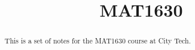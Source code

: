 \documentclass{ximera}
\title{MAT1630}
\begin{document}
  
\begin{abstract} %
This is a set of notes for the MAT1630 course at City Tech.  
\end{abstract}  
\maketitle  
 
 
\end{document}
